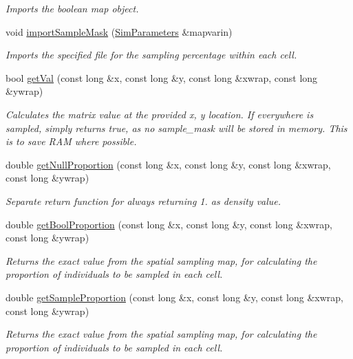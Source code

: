\begin{DoxyCompactItemize}
\begin{DoxyCompactList}\small\item\em Imports the boolean map object. \end{DoxyCompactList}\item 
void \hyperlink{class_data_mask_ac756e21b1c8d9412d565fb020eec9a06}{import\+Sample\+Mask} (\hyperlink{struct_sim_parameters}{Sim\+Parameters} \&mapvarin)
\begin{DoxyCompactList}\small\item\em Imports the specified file for the sampling percentage within each cell. \end{DoxyCompactList}\item 
bool \hyperlink{class_data_mask_ace6578db5b096b0c24112cc438cfa90d}{get\+Val} (const long \&x, const long \&y, const long \&xwrap, const long \&ywrap)
\begin{DoxyCompactList}\small\item\em Calculates the matrix value at the provided x, y location. If everywhere is sampled, simply returns true, as no sample\+\_\+mask will be stored in memory. This is to save R\+AM where possible. \end{DoxyCompactList}\item 
double \hyperlink{class_data_mask_af7a7cb35d309d37f42c7a3720a02b400}{get\+Null\+Proportion} (const long \&x, const long \&y, const long \&xwrap, const long \&ywrap)
\begin{DoxyCompactList}\small\item\em Separate return function for always returning 1. as density value. \end{DoxyCompactList}\item 
double \hyperlink{class_data_mask_a31cb42c363219967a7867340a7110e9f}{get\+Bool\+Proportion} (const long \&x, const long \&y, const long \&xwrap, const long \&ywrap)
\begin{DoxyCompactList}\small\item\em Returns the exact value from the spatial sampling map, for calculating the proportion of individuals to be sampled in each cell. \end{DoxyCompactList}\item 
double \hyperlink{class_data_mask_a682324892b67910b1dd2fa86a98c0873}{get\+Sample\+Proportion} (const long \&x, const long \&y, const long \&xwrap, const long \&ywrap)
\begin{DoxyCompactList}\small\item\em Returns the exact value from the spatial sampling map, for calculating the proportion of individuals to be sampled in each cell. \end{DoxyCompactList}\item 

\end{DoxyCompactItemize}
